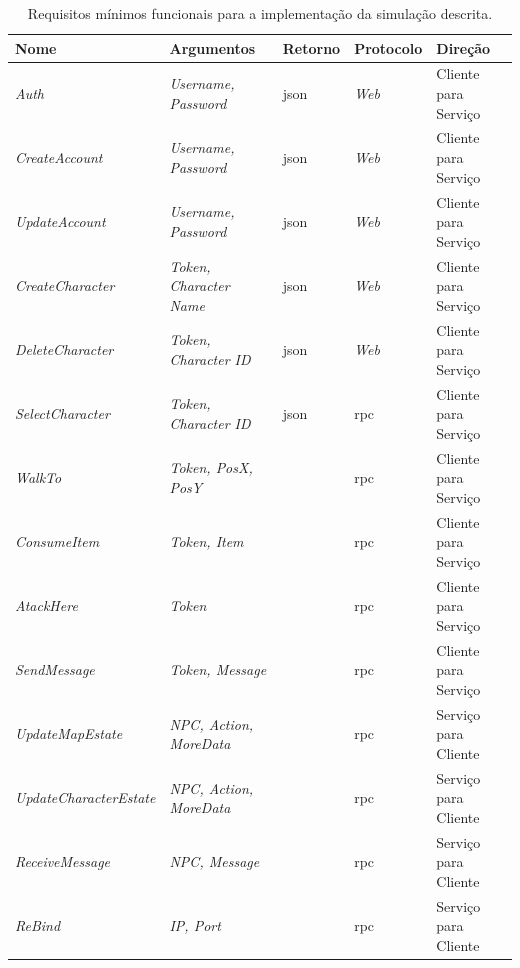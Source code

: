 \begin{table}[htb!]
\centering
\begin{adjustbox}{max width=\textwidth}
\caption{Requisitos mínimos funcionais para a implementação da simulação descrita.}
\label{tab:api_publica}
\begin{tabular}{|l|l|l|l|l|}
\hline
Nome                  & Argumentos            & Retorno & Protocolo & Direção              \\ \hline
\textit{Auth}                  & \textit{Username, Password}    & \ac{json} & \textit{Web}       & Cliente para Serviço \\ \hline
\textit{CreateAccount}         & \textit{Username, Password}    & \ac{json} & \textit{Web}       & Cliente para Serviço \\ \hline
\textit{UpdateAccount}         & \textit{Username, Password}    & \ac{json} & \textit{Web}       & Cliente para Serviço \\ \hline
\textit{CreateCharacter}       & \textit{Token, Character Name} & \ac{json} & \textit{Web}       & Cliente para Serviço \\ \hline
\textit{DeleteCharacter}       & \textit{Token, Character ID}   & \ac{json} & \textit{Web}       & Cliente para Serviço \\ \hline
\textit{SelectCharacter}       & \textit{Token, Character ID}   & \ac{json} & \ac{rpc}           & Cliente para Serviço \\ \hline
\textit{WalkTo}                & \textit{Token, PosX, PosY}     &           & \ac{rpc}           & Cliente para Serviço \\ \hline
\textit{ConsumeItem}           & \textit{Token, Item}           &           & \ac{rpc}           & Cliente para Serviço \\ \hline
\textit{AtackHere}             & \textit{Token}                 &           & \ac{rpc}           & Cliente para Serviço \\ \hline
\textit{SendMessage}           & \textit{Token, Message}        &           & \ac{rpc}           & Cliente para Serviço \\ \hline
\textit{UpdateMapEstate}       & \textit{NPC, Action, MoreData} &           & \ac{rpc}           & Serviço para Cliente \\ \hline
\textit{UpdateCharacterEstate} & \textit{NPC, Action, MoreData} &           & \ac{rpc}           & Serviço para Cliente \\ \hline
\textit{ReceiveMessage}        & \textit{NPC, Message}          &           & \ac{rpc}           & Serviço para Cliente \\ \hline
\textit{ReBind}                & \textit{IP, Port}              &           & \ac{rpc}           & Serviço para Cliente \\ \hline
\end{tabular}
\end{adjustbox}
\end{table}

